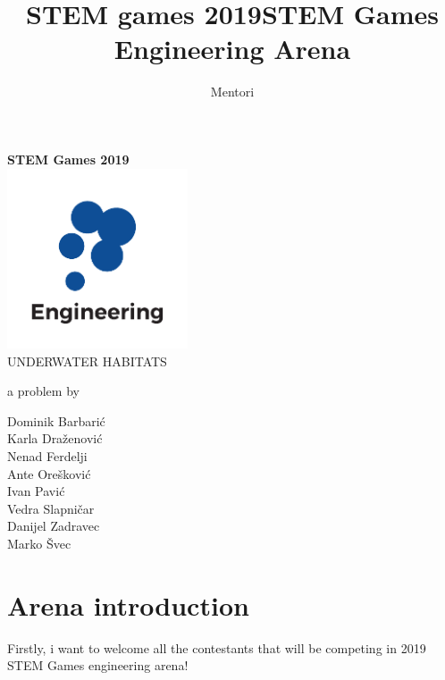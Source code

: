 \documentclass{article}
\title{STEM games 2019}
\author{Mentori}
\title{STEM Games Engineering Arena}
\date{}
\begin{document}
	
	\thispagestyle{empty}
	\newpage
	\thispagestyle{empty}
	\vspace*{0cm}
	\begin{center}
		
		\textbf{\Huge{STEM Games 2019}}\\
		\vspace*{2.4cm}
		\includegraphics[width=0.4\textwidth]{logos/engineering} \\
		\vspace*{2.4cm}
		\huge{UNDERWATER HABITATS}
		
		\medskip
		
		\normalsize{a problem by}
		
		\medskip
		
		Dominik Barbarić \\
		Karla Draženović \\
		Nenad Ferdelji \\
		Ante Orešković \\
		Ivan Pavić \\
		Vedra Slapničar \\
		Danijel Zadravec \\
		Marko Švec 
		
		\vspace{6cm}
		
		
		\normalsize{}
	\end{center}

	\newpage
	\section{Arena introduction}
	
	Firstly, i want to welcome all the contestants that will be competing in 
	2019 STEM Games engineering arena!
	
\end{document}

